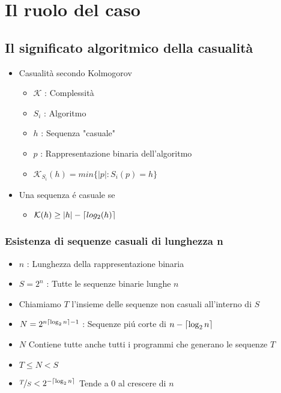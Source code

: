 \chapter{Il ruolo del caso}

\section{Il significato algoritmico della casualità}

\begin{itemize}
    \item Casualità secondo Kolmogorov
    \begin{itemize}
        \item $\mathcal{K}$ : Complessità
        \item $S_i$ : Algoritmo
        \item $h$ : Sequenza "casuale"
        \item $p$ : Rappresentazione binaria dell'algoritmo
        \item $\mathcal{K}_{S_i}(h) = min\{|p| : S_i(p) = h\}$
    \end{itemize}
    \item Una sequenza \'e casuale se
    \begin{itemize}
        \item $\mathcal{K}(h) \geq |h| - \lceil log_2(h)\rceil$
    \end{itemize}
\end{itemize}

\subsection{Esistenza di sequenze casuali di lunghezza n}

\begin{itemize}
    \item $n$ : Lunghezza della rappresentazione binaria
    \item $S = 2^n$ : Tutte le sequenze binarie lunghe $n$
    \item Chiamiamo $T$ l'insieme delle sequenze non casuali all'interno di $S$
    \item $N = 2^{n \lceil\log_2n\rceil - 1}$ : Sequenze pi\'u corte di $n - \lceil\log_2 n\rceil$
    \item $N$ Contiene tutte anche tutti i programmi che generano le sequenze $T$
    \item $T \leq N < S$
    \item $\nicefrac{T}{S} < 2^{-\lceil\log_2 n\rceil}$ Tende a $0$ al crescere di $n$
\end{itemize}

